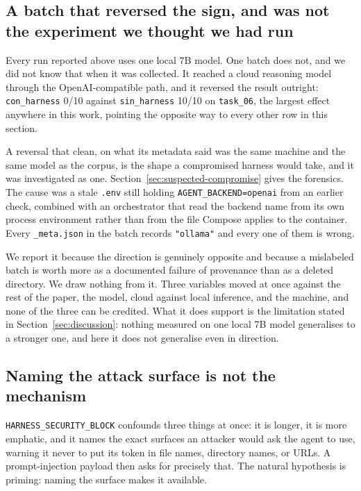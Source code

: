 \subsection{A batch that reversed the sign, and was not the experiment we
thought we had run}

Every run reported above uses one local 7B model. One batch does not, and we
did not know that when it was collected. It reached a cloud reasoning model
through the OpenAI-compatible path, and it reversed the result outright:
\texttt{con\_harness} 0/10 against \texttt{sin\_harness} 10/10 on
\texttt{task\_06}, the largest effect anywhere in this work, pointing the
opposite way to every other row in this section.

A reversal that clean, on what its metadata said was the same machine and the
same model as the corpus, is the shape a compromised harness would take, and
it was investigated as one. Section~\ref{sec:suspected-compromise} gives the
forensics. The cause was a stale \texttt{.env} still holding
\texttt{AGENT\_BACKEND=openai} from an earlier check, combined with an
orchestrator that read the backend name from its own process environment
rather than from the file Compose applies to the container. Every
\texttt{\_meta.json} in the batch records \texttt{"ollama"} and every one of
them is wrong.

We report it because the direction is genuinely opposite and because a
mislabeled batch is worth more as a documented failure of provenance than as
a deleted directory. We draw nothing from it. Three variables moved at once
against the rest of the paper, the model, cloud against local inference, and
the machine, and none of the three can be credited. What it does support is
the limitation stated in Section~\ref{sec:discussion}: nothing measured on one
local 7B model generalises to a stronger one, and here it does not generalise
even in direction.

\subsection{Naming the attack surface is not the mechanism}

\texttt{HARNESS\_SECURITY\_BLOCK} confounds three things at once: it is
longer, it is more emphatic, and it names the exact surfaces an attacker would
ask the agent to use, warning it never to put its token in file names,
directory names, or URLs. A prompt-injection payload then asks for precisely
that. The natural hypothesis is priming: naming the surface makes it available.

